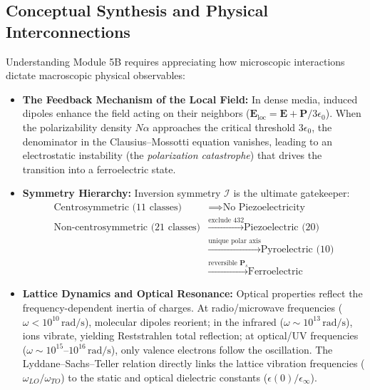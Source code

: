 \documentclass[11pt,a4paper]{article}
\begin{document}
\subsection{Conceptual Synthesis and Physical Interconnections}
Understanding Module 5B requires appreciating how microscopic interactions dictate macroscopic physical observables:
\begin{itemize}[leftmargin=*]
    \item \textbf{The Feedback Mechanism of the Local Field:} In dense media, induced dipoles enhance the field acting on their neighbors ($\mathbf{E}_{\text{loc}} = \mathbf{E} + \mathbf{P}/3\epsilon_0$). When the polarizability density $N\alpha$ approaches the critical threshold $3\epsilon_0$, the denominator in the Clausius--Mossotti equation vanishes, leading to an electrostatic instability (the \emph{polarization catastrophe}) that drives the transition into a ferroelectric state.
    \item \textbf{Symmetry Hierarchy:} Inversion symmetry $\mathcal{I}$ is the ultimate gatekeeper:
    \begin{align*}
        \text{Centrosymmetric (11 classes)} &\implies \text{No Piezoelectricity} \\
        \text{Non-centrosymmetric (21 classes)} &\xrightarrow{\text{exclude 432}} \text{Piezoelectric (20)} \\
        &\xrightarrow{\text{unique polar axis}} \text{Pyroelectric (10)} \\
        &\xrightarrow{\text{reversible }\mathbf{P}_s} \text{Ferroelectric}
    \end{align*}
    \item \textbf{Lattice Dynamics and Optical Resonance:} Optical properties reflect the frequency-dependent inertia of charges. At radio/microwave frequencies ($\omega < 10^{10}\,\text{rad/s}$), molecular dipoles reorient; in the infrared ($\omega \sim 10^{13}\,\text{rad/s}$), ions vibrate, yielding Reststrahlen total reflection; at optical/UV frequencies ($\omega \sim 10^{15}$--$10^{16}\,\text{rad/s}$), only valence electrons follow the oscillation. The Lyddane--Sachs--Teller relation directly links the lattice vibration frequencies ($\omega_{LO}/\omega_{TO}$) to the static and optical dielectric constants ($\epsilon(0)/\epsilon_\infty$).
\end{itemize}

\newpage
\end{document}
